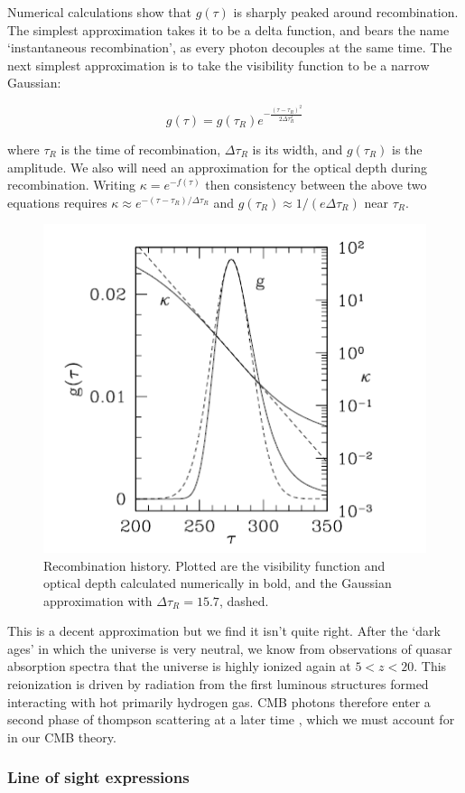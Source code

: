 \documentclass[a4paper,10pt]{article}
\begin{document}
Numerical calculations show that $g(\tau)$ is sharply peaked around recombination. The simplest approximation takes it to be a delta function, and bears the name `instantaneous recombination', as every photon decouples at the same time. The next simplest approximation is to take the visibility function to be a narrow Gaussian:

\begin{equation}
g(\tau) = g(\tau_R)e^{-\frac{(\tau-\tau_R)^2}{2\Delta\tau_R^2}}
\end{equation}

where $\tau_R$ is the time of recombination, $\Delta\tau_R$ is its width, and $g(\tau_R)$ is the amplitude. We also will need an approximation for the optical depth during recombination. Writing $\kappa = e^{-f(\tau)}$ then consistency between the above two equations requires $\kappa \approx e^{-(\tau-\tau_R) / \Delta\tau_R}$ and $g(\tau_R)\approx 1/(e\Delta\tau_R)$ near $\tau_R$. 

\begin{figure}[h]
  \includegraphics[width=0.5\linewidth]{recombinationhistory.png}
  \centering
  \caption{Recombination history. Plotted are the visibility function and optical depth calculated numerically in bold, and the Gaussian approximation with $\Delta\tau_R=15.7$, dashed. }
\end{figure}

This is a decent approximation but we find it isn't quite right. After the `dark ages' in which the universe is very neutral, we know from observations of quasar absorption spectra that the universe is highly ionized again at $5<z<20$. This reionization is driven by radiation from the first luminous structures formed interacting with hot primarily hydrogen gas. CMB photons therefore enter a second phase of thompson scattering at a later time \cite{reionisation}, which we must account for in our CMB theory.

\subsubsection{Line of sight expressions}
\end{document}
